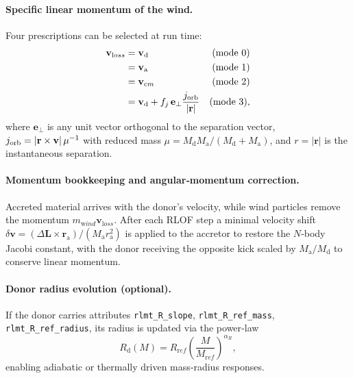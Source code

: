 \documentclass[11pt]{article}
\begin{document}
\paragraph{Specific linear momentum of the wind.}
Four prescriptions can be selected at run time:
\begin{subequations}\label{eq:joptions}
\begin{align}
\mathbf v_{\mathrm loss} &= \mathbf v_{\mathrm d} & (\text{mode }0)\\
                         &= \mathbf v_{\mathrm a} & (\text{mode }1)\\
                         &= \mathbf v_{\mathrm cm}& (\text{mode }2)\\
                         &= \mathbf v_{\mathrm d} + f_j\,\mathbf e_\perp
                            \frac{j_{\rm orb}}{\lvert\mathbf r\rvert} & (\text{mode }3),
\end{align}
\end{subequations}
where $\mathbf e_\perp$ is any unit vector orthogonal to the separation
vector, $j_{\rm orb}=|\mathbf r\times\mathbf v|\,\mu^{-1}$ with reduced mass
$\mu=M_{\mathrm d}M_{\mathrm a}/(M_{\mathrm d}+M_{\mathrm a})$, and
$r=|\mathbf r|$ is the instantaneous separation.

\paragraph{Momentum bookkeeping and angular‑momentum correction.}
Accreted material arrives with the donor’s velocity, while wind
particles remove the momentum $m_{\mathrm wind}\mathbf v_{\mathrm loss}$.
After each RLOF step a minimal
velocity shift
\(
\delta\mathbf v=(\Delta\mathbf L\times\mathbf r_{\mathrm a})/(M_{\mathrm a}r_{\mathrm a}^2)
\)
is applied to the accretor to restore the $N$‑body Jacobi constant, with the
donor receiving the opposite kick scaled by $M_{\mathrm a}/M_{\mathrm d}$ to
conserve linear momentum.

\paragraph{Donor radius evolution (optional).}
If the donor carries attributes
\texttt{rlmt\_R\_slope}, \texttt{rlmt\_R\_ref\_mass},
\texttt{rlmt\_R\_ref\_radius}, its radius is updated via the power‑law
\[
R_{\mathrm d}(M)=R_{\mathrm ref}
\left(\frac{M}{M_{\mathrm ref}}\right)^{\alpha_R},
\]
enabling adiabatic or thermally driven mass‑radius responses.

\end{document}
